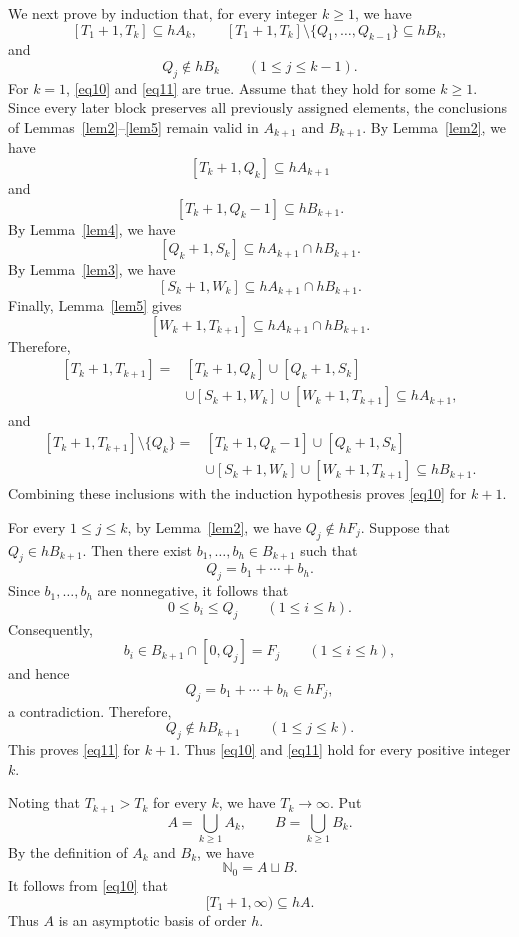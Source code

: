 \documentclass[reqno,12pt,twoside]{article}
\numberwithin{equation}{section}
\newcommand{\Nzero}{\mathbb N_0}
\begin{document}
We next prove by induction that, for every integer $k\ge1$, we have
\begin{equation}\label{eq10}
[T_1+1,T_k]\subseteq hA_k,
\qquad
[T_1+1,T_k]\setminus\{Q_1,\ldots,Q_{k-1}\}\subseteq hB_k,
\end{equation}
and
\begin{equation}\label{eq11}
Q_j\notin hB_k\qquad(1\le j\le k-1).
\end{equation}
For $k=1$, \eqref{eq10} and \eqref{eq11} are true. Assume that they hold for some $k\ge1$. Since every later block preserves all previously assigned elements, the conclusions of Lemmas~\ref{lem2}--\ref{lem5} remain valid in $A_{k+1}$ and $B_{k+1}$. By Lemma~\ref{lem2}, we have
\[
 [T_k+1,Q_k]\subseteq hA_{k+1}
\]
and
\[
 [T_k+1,Q_k-1]\subseteq hB_{k+1}.
\]
By Lemma~\ref{lem4}, we have
\[
 [Q_k+1,S_k]\subseteq hA_{k+1}\cap hB_{k+1}.
\]
By Lemma~\ref{lem3}, we have
\[
 [S_k+1,W_k]\subseteq hA_{k+1}\cap hB_{k+1}.
\]
Finally, Lemma~\ref{lem5} gives
\[
 [W_k+1,T_{k+1}]\subseteq hA_{k+1}\cap hB_{k+1}.
\]
Therefore,
\[
 \begin{split}
 [T_k+1,T_{k+1}]
 ={}&[T_k+1,Q_k]\cup[Q_k+1,S_k]\\
 &\cup[S_k+1,W_k]\cup[W_k+1,T_{k+1}]
 \subseteq hA_{k+1},
 \end{split}
\]
and
\[
 \begin{split}
 [T_k+1,T_{k+1}]\setminus\{Q_k\}
 ={}&[T_k+1,Q_k-1]\cup[Q_k+1,S_k]\\
 &\cup[S_k+1,W_k]\cup[W_k+1,T_{k+1}]
 \subseteq hB_{k+1}.
 \end{split}
\]
Combining these inclusions with the induction hypothesis proves \eqref{eq10} for $k+1$.

For every $1\leq j\leq k$, by Lemma~\ref{lem2}, we have $Q_j\notin hF_j$. Suppose that $Q_j\in hB_{k+1}$. Then there exist $b_1,\ldots,b_h\in B_{k+1}$ such that
\[
 Q_j=b_1+\cdots+b_h.
\]
Since $b_1,\ldots,b_h$ are nonnegative, it follows that
\[
 0\le b_i\le Q_j\qquad(1\le i\le h).
\]
Consequently,
\[
 b_i\in B_{k+1}\cap[0,Q_j]=F_j\qquad(1\le i\le h),
\]
and hence
\[
 Q_j=b_1+\cdots+b_h\in hF_j,
\]
a contradiction. Therefore,
\[
 Q_j\notin hB_{k+1}\qquad(1\le j\le k).
\]
This proves \eqref{eq11} for $k+1$. Thus \eqref{eq10} and \eqref{eq11} hold for every positive integer $k$.

Noting that $T_{k+1}>T_k$ for every $k$, we have $T_k\to\infty$. Put
\[
 A=\bigcup_{k\ge1}A_k,\qquad B=\bigcup_{k\ge1}B_k.
\]
By the definition of $A_k$ and $B_k$, we have
\[
 \Nzero=A\sqcup B.
\]
It follows from \eqref{eq10} that
\[
 [T_1+1,\infty)\subseteq hA.
\]
Thus $A$ is an asymptotic basis of order $h$.
\end{document}
